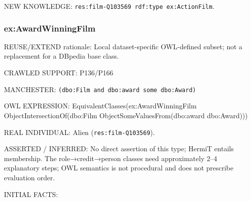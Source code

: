 \documentclass[
  11pt,
]{article}
\begin{document}
NEW KNOWLEDGE:
\texttt{res:\allowbreak{}film\allowbreak{}-\allowbreak{}\allowbreak{}Q103569\allowbreak{} rdf:\allowbreak{}typ\allowbreak{}e ex:\allowbreak{}\allowbreak{}Act\allowbreak{}ion\allowbreak{}Film}.

\subsubsection{\texorpdfstring{ex:\allowbreak{}\allowbreak{}Award\allowbreak{}\allowbreak{}Winning\allowbreak{}F\allowbreak{}ilm}{}}\label{exawardwinningfilm}

REUSE/EXTEND rationale: Local dataset-\allowbreak{}specific\allowbreak{}
OWL-defined subset; not a replacement for a DBpedia base class.

CRAWLED SUPPORT: P136/P166

MANCHESTER:
\texttt{(dbo:\allowbreak{}\allowbreak{}Fil\allowbreak{}m and db\allowbreak{}o:\allowbreak{}award \allowbreak{}some dbo\allowbreak{}:\allowbreak{}\allowbreak{}Award)}

OWL EXPRESSION:
Equivale\allowbreak{}nt\allowbreak{}Classe\allowbreak{}s(ex:\allowbreak{}\allowbreak{}Awa\allowbreak{}rd\allowbreak{}Winnin\allowbreak{}g\allowbreak{}Film
Object\allowbreak{}In\allowbreak{}tersecti\allowbreak{}on\allowbreak{}Of(dbo\allowbreak{}:\allowbreak{}\allowbreak{}Film
Object\allowbreak{}So\allowbreak{}me\allowbreak{}Values\allowbreak{}\allowbreak{}From(dbo\allowbreak{}:\allowbreak{}award
dbo:Award)))

REAL INDIVIDUAL: Alien
(\texttt{res:\allowbreak{}film\allowbreak{}-\allowbreak{}\allowbreak{}Q103569\allowbreak{}}).

ASSERTED / INFERRED: No direct assertion of this type; HermiT entails
membership. The role→credit→person classes need
approxim\allowbreak{}ately 2--4 explanatory steps; OWL semantics is not
procedural and does not prescribe evaluation order.

INITIAL FACTS:
\end{document}
